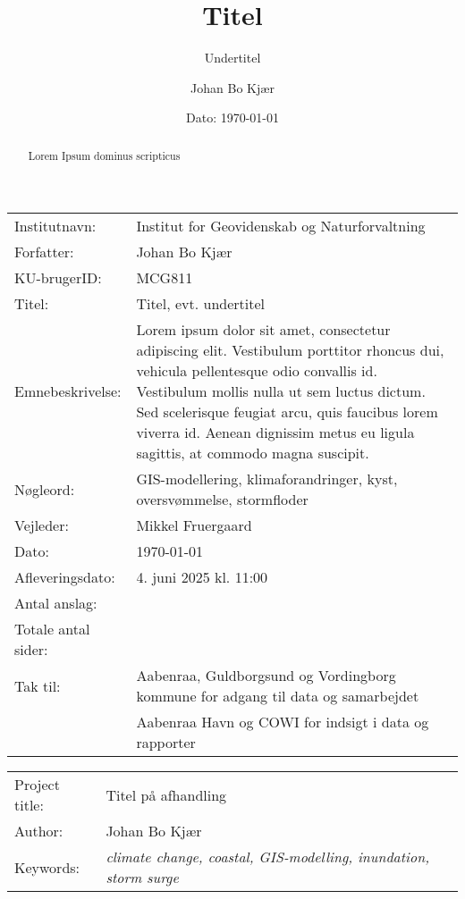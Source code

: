 \documentclass[12pt]{article}
\author{Johan Bo Kjær}
\title{Titel}
\subtitle{Undertitel}
\date{Dato: {\today}}
\begin{document}
\maketitle


\onehalfspacing


\begin{table}[h]
\def\arraystretch{1.5}
\begin{tabularx}{\textwidth}{l X}
Institutnavn: & {Institut for Geovidenskab og Naturforvaltning}  \\
Forfatter: & {Johan Bo Kjær} \\
KU-brugerID: & {MCG811} \\
Titel: & {Titel, evt. undertitel} \\
Emnebeskrivelse: & Lorem ipsum dolor sit amet, consectetur adipiscing elit. Vestibulum porttitor rhoncus dui, vehicula pellentesque odio convallis id. Vestibulum mollis nulla ut sem luctus dictum. Sed scelerisque feugiat arcu, quis faucibus lorem viverra id. Aenean dignissim metus eu ligula sagittis, at commodo magna suscipit. \\
Nøgleord: & GIS-modellering, klimaforandringer, kyst, oversvømmelse, stormfloder \\
Vejleder: & Mikkel Fruergaard \\
Dato: & \today \\
Afleveringsdato: & 4. juni 2025 kl. 11:00 \\
Antal anslag: &  \\
Totale antal sider: &  \\
Tak til: & Aabenraa, Guldborgsund og Vordingborg kommune for adgang til data og samarbejdet\\
& Aabenraa Havn og COWI for indsigt i data og rapporter
\end{tabularx} 
\end{table}

\renewcommand{\contentsname}{Indholdsfortegnelse} %
\renewcommand{\abstractname}{Abstract} %
\renewcommand{\refname}{} %


\newpage
\begin{table}[h]
\def\arraystretch{1.5}
\begin{tabularx}{\textwidth}{l X}
\Large{Project title:} & \Large{Titel på afhandling} \\
Author: & {Johan Bo Kjær} \\
Keywords: & \textit{climate change, coastal, GIS-modelling, inundation, storm surge}
\end{tabularx}
\end{table}
\begin{abstract}
    Lorem Ipsum dominus scripticus
\end{abstract}
\end{document}
